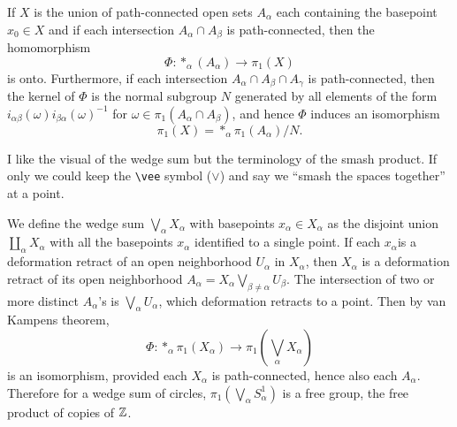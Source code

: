 \begin{theorem}
    If $X$ is the union of path-connected open sets $A_{\alpha}$ each containing the basepoint $x_0\in X$ and if each intersection $A_{\alpha}\cap A_{\beta}$ is path-connected, then the homomorphism \[
        \Phi \colon *_{\alpha}(A_{\alpha}) \to \pi_1(X)
    \] is onto. Furthermore, if each intersection $A_{\alpha}\cap A_{\beta}\cap A_{\gamma}$ is path-connected, then the kernel of $\Phi$ is the normal subgroup $N$ generated by all elements of the form $i_{\alpha\beta}(\omega)i_{\beta\alpha}(\omega)^{-1}$ for $\omega \in \pi_1(A_{\alpha}\cap A_{\beta})$, and hence $\Phi$ induces an isomorphism \[
    \pi_1(X)=*_{\alpha}\pi_1(A_{\alpha}) /N.
    \] 
\end{theorem}
\begin{example}
    I like the visual of the wedge sum but the terminology of the smash product. If only we could keep the \texttt{\textbackslash vee} symbol ($\vee$) and say we ``smash the spaces together'' at a point. 

    We define the wedge sum $\bigvee_{\alpha}X_{\alpha}$ with basepoints $x_{\alpha}\in X_{\alpha}$ as the disjoint union $\amalg_{\alpha}X_{\alpha}$ with all the basepoints $x_{\alpha}$ identified to a single point. If each $x_{\alpha}$is a deformation retract of an open neighborhood $U_{\alpha }$ in $X_{\alpha }$, then $X_{\alpha }$ is a deformation retract of its open neighborhood $A_{\alpha }=X_{\alpha }\bigvee_{\beta\neq\alpha }U_{\beta}$. The intersection of two or more distinct $A_{\alpha }$'s is $\bigvee_{\alpha }U_{\alpha }$, which deformation retracts to a point. Then by van Kampens theorem, \[
        \Phi \colon *_{\alpha }\pi_1(X_{\alpha }) \to \pi_1(\bigvee_{\alpha }X_{\alpha })
    \] is an isomorphism, provided each $X_{\alpha }$ is path-connected, hence also each $A_{\alpha }$. Therefore for a wedge sum of circles, $\pi_1(\bigvee_{\alpha }S_{\alpha }^{1})$ is a free group, the free product of copies of $\mathbb{Z}$.
\end{example}


